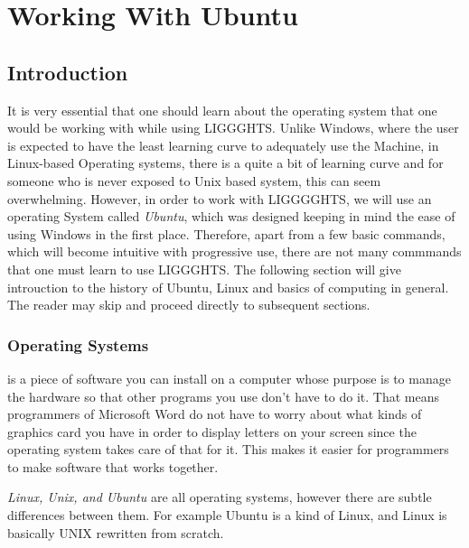 \documentclass{tufte-book} %
\begin{document}
\chapter{Working With Ubuntu}
\label{ch:1}


\section{Introduction}

\begin{fullwidth}
  It is very essential that one should learn about the operating system that one would be working with while using \textsc{LIGGGHTS}. Unlike Windows, where the user is expected to have the least learning curve to adequately use the Machine, in Linux-based Operating systems, there is a quite a bit of learning curve and for someone who is never exposed to Unix based system, this can seem overwhelming. However, in order to work with \textsc{LIGGGGHTS}, we will use an operating System called \emph{Ubuntu}, which was designed keeping in mind the ease of using Windows in the first place. Therefore, apart from a few basic commands, which will become intuitive with progressive use, there are not many commmands that one must learn to use \textsc{LIGGGHTS}. The following section will give introuction to the history of Ubuntu, Linux and basics of computing in general. The reader may skip and proceed directly to subsequent sections.
\end{fullwidth}

\subsection{Operating Systems}

 is a piece of software you can install on a computer whose purpose is to manage the hardware so that other programs you use don't have to do it. That means programmers of Microsoft Word do not have to worry about what kinds of graphics card you have in order to display letters on your screen since the operating system takes care of that for it. This makes it easier for programmers to make software that works together. 

\emph{Linux, Unix, and Ubuntu} are all operating systems, however there are subtle differences between them. For example Ubuntu is a kind of Linux, and Linux is basically UNIX rewritten from scratch.
\end{document}
